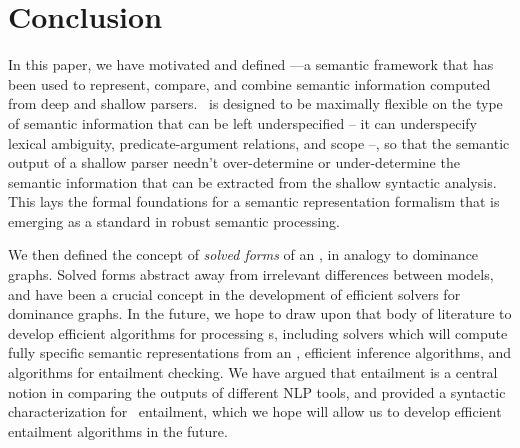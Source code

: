 \section{Conclusion}
\label{sec:conclusion}

In this paper, we have motivated and defined \rmrs---a semantic
framework that has been used to represent, compare, and combine
semantic information computed from deep and shallow parsers.  \rmrs\
is designed to be maximally flexible on the type of semantic
information that can be left underspecified -- it can underspecify
lexical ambiguity, predicate-argument relations, and scope --, so that
the semantic output of a shallow parser needn't over-determine or
under-determine the semantic information that can be extracted from
the shallow syntactic analysis.  This lays the formal foundations for
a semantic representation formalism that is emerging as a standard in
robust semantic processing.

We then defined the concept of \emph{solved forms} of an \rmrs, in
analogy to dominance graphs.  Solved forms abstract away from
irrelevant differences between models, and have been a crucial concept
in the development of efficient solvers for dominance graphs.  In the
future, we hope to draw upon that body of literature to develop
efficient algorithms for processing \rmrs s, including solvers which
will compute fully specific semantic representations from an \rmrs,
efficient inference algorithms, and algorithms for entailment
checking.  We have argued that entailment is a central notion in
comparing the outputs of different NLP tools, and provided a syntactic
characterization for \rmrs\ entailment, which we hope will allow us to
develop efficient entailment algorithms in the future.


